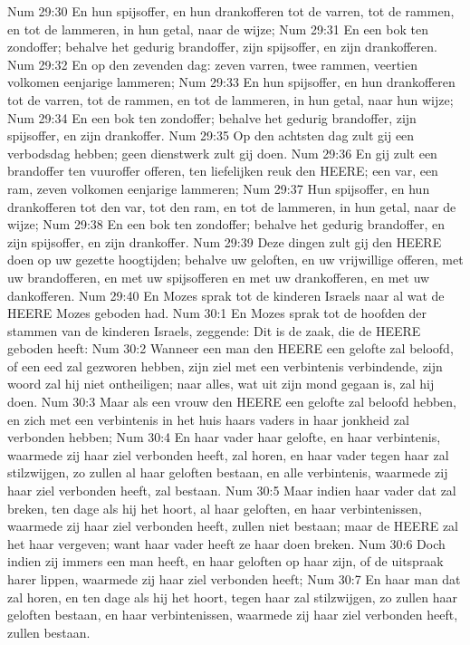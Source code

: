 Num 29:30  En hun spijsoffer, en hun drankofferen tot de varren, tot de rammen, en tot de lammeren, in hun getal, naar de wijze;
Num 29:31  En een bok ten zondoffer; behalve het gedurig brandoffer, zijn spijsoffer, en zijn drankofferen.
Num 29:32  En op den zevenden dag: zeven varren, twee rammen, veertien volkomen eenjarige lammeren;
Num 29:33  En hun spijsoffer, en hun drankofferen tot de varren, tot de rammen, en tot de lammeren, in hun getal, naar hun wijze;
Num 29:34  En een bok ten zondoffer; behalve het gedurig brandoffer, zijn spijsoffer, en zijn drankoffer.
Num 29:35  Op den achtsten dag zult gij een verbodsdag hebben; geen dienstwerk zult gij doen.
Num 29:36  En gij zult een brandoffer ten vuuroffer offeren, ten liefelijken reuk den HEERE; een var, een ram, zeven volkomen eenjarige lammeren;
Num 29:37  Hun spijsoffer, en hun drankofferen tot den var, tot den ram, en tot de lammeren, in hun getal, naar de wijze;
Num 29:38  En een bok ten zondoffer; behalve het gedurig brandoffer, en zijn spijsoffer, en zijn drankoffer.
Num 29:39  Deze dingen zult gij den HEERE doen op uw gezette hoogtijden; behalve uw geloften, en uw vrijwillige offeren, met uw brandofferen, en met uw spijsofferen en met uw drankofferen, en met uw dankofferen.
Num 29:40  En Mozes sprak tot de kinderen Israels naar al wat de HEERE Mozes geboden had.
Num 30:1  En Mozes sprak tot de hoofden der stammen van de kinderen Israels, zeggende: Dit is de zaak, die de HEERE geboden heeft:
Num 30:2  Wanneer een man den HEERE een gelofte zal beloofd, of een eed zal gezworen hebben, zijn ziel met een verbintenis verbindende, zijn woord zal hij niet ontheiligen; naar alles, wat uit zijn mond gegaan is, zal hij doen.
Num 30:3  Maar als een vrouw den HEERE een gelofte zal beloofd hebben, en zich met een verbintenis in het huis haars vaders in haar jonkheid zal verbonden hebben;
Num 30:4  En haar vader haar gelofte, en haar verbintenis, waarmede zij haar ziel verbonden heeft, zal horen, en haar vader tegen haar zal stilzwijgen, zo zullen al haar geloften bestaan, en alle verbintenis, waarmede zij haar ziel verbonden heeft, zal bestaan.
Num 30:5  Maar indien haar vader dat zal breken, ten dage als hij het hoort, al haar geloften, en haar verbintenissen, waarmede zij haar ziel verbonden heeft, zullen niet bestaan; maar de HEERE zal het haar vergeven; want haar vader heeft ze haar doen breken.
Num 30:6  Doch indien zij immers een man heeft, en haar geloften op haar zijn, of de uitspraak harer lippen, waarmede zij haar ziel verbonden heeft;
Num 30:7  En haar man dat zal horen, en ten dage als hij het hoort, tegen haar zal stilzwijgen, zo zullen haar geloften bestaan, en haar verbintenissen, waarmede zij haar ziel verbonden heeft, zullen bestaan.
